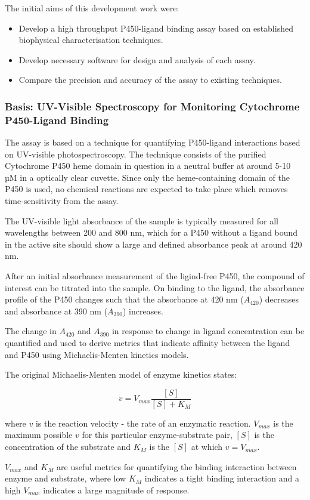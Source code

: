 \documentclass{article}
\begin{document}
The initial aims of this development work were:

\begin{itemize}
	\item Develop a high throughput P450-ligand binding assay based on established biophysical characterisation techniques.
	\item Develop necessary software for design and analysis of each assay.
	\item Compare the precision and accuracy of the assay to existing techniques.
\end{itemize}

\subsubsection{Basis: UV-Visible Spectroscopy for Monitoring Cytochrome P450-Ligand Binding}

The assay is based on a technique for quantifying P450-ligand interactions based on UV-visible photospectroscopy.
The technique consists of the purified Cytochrome P450 heme domain in question in a neutral buffer at around 5-10 µM in a optically clear cuvette.
Since only the heme-containing domain of the P450 is used, no chemical reactions are expected to take place which removes time-sensitivity from the assay.
\par

The UV-visible light absorbance of the sample is typically measured for all wavelengths between 200 and 800 nm, which for a P450 without a ligand bound in the active site should show a large and defined absorbance peak at around 420 nm.
\par
After an initial absorbance measurement of the ligind-free P450, the compound of interest can be titrated into the sample.
On binding to the ligand, the absorbance profile of the P450 changes such that the absorbance at 420 nm ($A_{420}$) decreases and absorbance at 390 nm ($A_{390}$) increases.
\par
The change in $A_{420}$ and $A_{390}$ in response to change in ligand concentration can be quantified and used to derive metrics that indicate affinity between the ligand and P450 using Michaelis-Menten kinetics models.
\par
The original Michaelis-Menten model of enzyme kinetics states:

$$ v = V_{max} \frac{[S]}{[S] + K_M} $$

where $v$ is the reaction velocity - the rate of an enzymatic reaction. 
$V_{max}$ is the maximum possible $v$ for this particular enzyme-substrate pair, $[S]$ is the concentration of the substrate and $K_M$ is the $[S]$ at which $v = V_{max}$.
\par
$V_{max}$ and $K_M$ are useful metrics for quantifying the binding interaction between enzyme and substrate, where low $K_M$ indicates a tight binding interaction and a high $V_{max}$ indicates a large magnitude of response.
\end{document}

